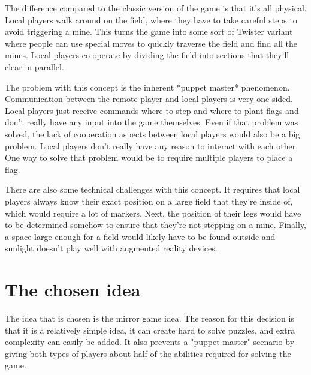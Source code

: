 	The difference compared to the classic version of the game is that it's all
	physical. Local players walk around on the field, where they have to take
	careful steps to avoid triggering a mine. This turns the game into some sort
	of Twister variant where people can use special moves to quickly traverse
	the field and find all the mines. Local players co-operate by dividing the
	field into sections that they'll clear in parallel.

	The problem with this concept is the inherent *puppet master* phenomenon.
	Communication between the remote player and local players is very one-sided.
	Local players just receive commands where to step and where to plant flags
	and don't really have any input into the game themselves. Even if that
	problem was solved, the lack of cooperation aspects between local players
	would also be a big problem. Local players don't really have any reason to
	interact with each other. One way to solve that problem would be to require
	multiple players to place a flag.

	There are also some technical challenges with this concept. It requires that
	local players always know their exact position on a large field that they're
	inside of, which would require a lot of markers. Next, the position of their
	legs would have to be determined somehow to ensure that they're not stepping
	on a mine. Finally, a space large enough for a field would likely have to be
	found outside and sunlight doesn't play well with augmented reality devices.

\section{The chosen idea}
	The idea that is chosen is the mirror game idea. The reason for this
	decision is that it is a relatively simple idea, it can create hard
	to solve puzzles, and extra complexity can easily be added. It also
	prevents a "puppet master" scenario by giving both types of players
	about half of the abilities required for solving the game.
